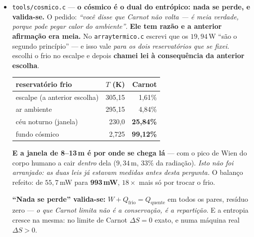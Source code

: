 \documentclass[11pt]{article}
\newcommand{\code}[1]{\texttt{\small #1}}
\theoremstyle{plain}
\theoremstyle{remark}
\begin{document}
\begin{itemize}
\textbf{E o achado é uma identidade:} $[\sigma_i,\sigma_j] = 2i\,\varepsilon_{ijk}\sigma_k$ contra
$e_i\times e_j = \varepsilon_{ijk}e_k$ --- \textbf{nos nove pares, resíduo zero}. O produto de Pauli
parte-se exatamente nas quatro peças do §B4: \emph{o anti-comutador é o DIRETO} ($\{\sigma_i,
\sigma_j\}=2\delta_{ij}I$, e só mede) e \emph{o comutador é o CRUZADO}.

\textbf{E a incerteza sai daí.} Robertson tem o comutador do lado direito, e ele é a peça que
ordena: onde comuta não há preço, onde não comuta há. \emph{A incerteza não é limitação de
instrumento --- é o cruzado a cobrar}, o mesmo imposto do \code{dtcn.c} §U7. E §Q6: a \textbf{evolução
tem dual} ($U^{-1}=U^\dagger$) e a \textbf{medida não} ($\det P = 0$, dois estados colapsam no
mesmo). \textbf{19 unidades, resíduo 0.}

\item \code{tools/cosmico.c} --- \textbf{o cósmico é o dual do entrópico: nada se perde, e
valida-se.} O pedido: \emph{``você disse que Carnot não volta --- é meia verdade, porque pode pegar
calor do ambiente''}. \textbf{Ele tem razão e a anterior afirmação era meia.} No \code{arraytermico.c}
escrevi que os $19{,}94$\,W ``são o segundo princípio'' --- e isso vale \emph{para os dois
reservatórios que se fixei}. escolhi o frio no escalpe e depois \textbf{chamei lei à consequência
da anterior escolha}.

\begin{center}
\begin{tabular}{lrr}
\toprule
reservatório frio & $T$ (K) & Carnot \\
\midrule
escalpe (a anterior escolha) & 305,15 & 1,61\% \\
ar ambiente & 295,15 & 4,84\% \\
céu noturno (janela) & 230,0 & \textbf{25,84\%} \\
fundo cósmico & 2,725 & \textbf{99,12\%} \\
\bottomrule
\end{tabular}
\end{center}

\textbf{E a janela de 8--13\,\textmu m é por onde se chega lá} --- com o pico de Wien do corpo humano
a cair \emph{dentro} dela ($9{,}34$\,\textmu m, $33\%$ da radiação). \emph{Isto não foi arranjado: as
duas leis já estavam medidas antes desta pergunta.} O balanço refeito: de $55{,}7$\,mW para
\textbf{993\,mW}, $18\times$ mais só por trocar o frio.

\textbf{``Nada se perde'' valida-se:} $W + Q_{\text{frio}} = Q_{\text{quente}}$ em todos os pares,
resíduo zero --- \emph{o que Carnot limita não é a conservação, é a repartição}. E a entropia cresce
na mesma: no limite de Carnot $\Delta S = 0$ exato, e numa máquina real $\Delta S > 0$.


\end{itemize}
\end{document}
